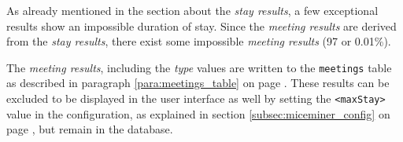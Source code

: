 As already mentioned in the section about the \textit{stay results}, a few exceptional results show an impossible duration of stay. Since the \textit{meeting results} are derived from the \textit{stay results}, there exist some impossible \textit{meeting results} (97 or 0.01\%).  

The \textit{meeting results}, including the \textit{type} values are written to the \lstinline|meetings| table as described in paragraph \ref{para:meetings_table} on page \pageref{para:meetings_table}. These results can be excluded to be displayed in the user interface as well by setting the \lstinline|<maxStay>| value in the configuration, as explained in section \ref{subsec:miceminer_config} on page \pageref{subsec:miceminer_config}, but remain in the database.
